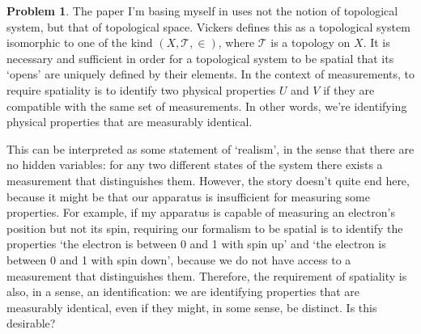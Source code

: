 \documentclass{article}
\theoremstyle{definition}
\newtheorem{problem}{Problem}
\theoremstyle{plain}
\begin{document}
\begin{problem}
The paper I'm basing myself in \cite{measurement} uses not the notion of topological system, but that of topological space. Vickers defines this as a topological system isomorphic to one of the kind $(X, \mathcal{T}, \in)$, where $\mathcal{T}$ is a topology on $X$. It is necessary and sufficient in order for a topological system to be spatial that its `opens' are uniquely defined by their elements. In the context of measurements, to require spatiality is to identify two physical properties $U$ and $V$ if they are compatible with the same set of measurements. In other words, we're identifying physical properties that are measurably identical.

This can be interpreted as some statement of `realism', in the sense that there are no hidden variables: for any two different states of the system there exists a measurement that distinguishes them. However, the story doesn't quite end here, because it might be that our apparatus is insufficient for measuring some properties. For example, if my apparatus is capable of measuring an electron's position but not its spin, requiring our formalism to be spatial is to identify the properties `the electron is between 0 and 1 with spin up' and `the electron is between 0 and 1 with spin down', because we do not have access to a measurement that distinguishes them. Therefore, the requirement of spatiality is also, in a sense, an identification: we are identifying properties that are measurably identical, even if they might, in some sense, be distinct. Is this desirable?
\end{problem}
\end{document}
